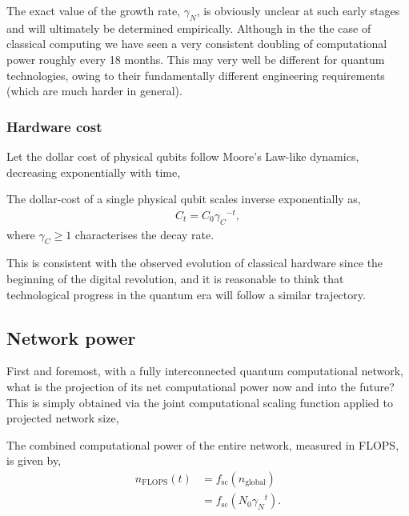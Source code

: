 The exact value of the growth rate, $\gamma_N$, is obviously unclear at such early stages and will ultimately be determined empirically. Although in the the case of classical computing we have seen a very consistent doubling of computational power roughly every 18 months. This may very well be different for quantum technologies, owing to their fundamentally different engineering requirements (which are much harder in general).

%
%

\subsubsection{Hardware cost} 

Let the dollar cost of physical qubits follow Moore's Law-like dynamics, decreasing exponentially with time,
\begin{postulate}\label{post:hardware_cost}
The dollar-cost of a single physical qubit scales inverse exponentially as,
\begin{align}
	C_t = C_0 {\gamma_C}^{-t},
\end{align}
where \mbox{$\gamma_C\geq 1$} characterises the decay rate.
\end{postulate}

This is consistent with the observed evolution of classical hardware since the beginning of the digital revolution, and it is reasonable to think that technological progress in the quantum era will follow a similar trajectory.

%
%

\subsection{Network power}

First and foremost, with a fully interconnected quantum computational network, what is the projection of its net computational power now and into the future? This is simply obtained via the joint computational scaling function applied to projected network size,

\begin{postulate}\label{post:network_power}
The combined computational power of the entire network, measured in FLOPS, is given by,
\begin{align}
n_\text{FLOPS}(t) &= f_\text{sc}(n_\text{global})\nonumber \\
&= f_\text{sc}(N_0{\gamma_N}^t).
\end{align}
\end{postulate}

